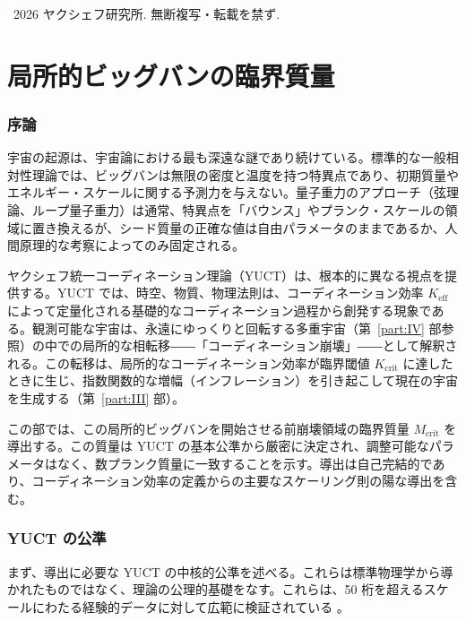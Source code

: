 \documentclass[11pt,a4paper]{article}
\begin{document}
	\vspace{0.5cm}
	\noindent
	\textcopyright\ 2026 ヤクシェフ研究所. 無断複写・転載を禁ず.
	
	\tableofcontents
	\newpage
	
	\part{局所的ビッグバンの臨界質量}
	\label{part:I}
	
	\section{序論}
	
	宇宙の起源は、宇宙論における最も深遠な謎であり続けている。標準的な一般相対性理論では、ビッグバンは無限の密度と温度を持つ特異点であり、初期質量やエネルギー・スケールに関する予測力を与えない。量子重力のアプローチ（弦理論、ループ量子重力）は通常、特異点を「バウンス」やプランク・スケールの領域に置き換えるが、シード質量の正確な値は自由パラメータのままであるか、人間原理的な考察によってのみ固定される。
	
	ヤクシェフ統一コーディネーション理論（YUCT）は、根本的に異なる視点を提供する。YUCT では、時空、物質、物理法則は、コーディネーション効率 \(K_{\mathrm{eff}}\) によって定量化される基礎的なコーディネーション過程から創発する現象である。観測可能な宇宙は、永遠にゆっくりと回転する多重宇宙（第~\ref{part:IV} 部参照）の中での局所的な相転移――「コーディネーション崩壊」――として解釈される。この転移は、局所的なコーディネーション効率が臨界閾値 \(K_{\mathrm{crit}}\) に達したときに生じ、指数関数的な増幅（インフレーション）を引き起こして現在の宇宙を生成する（第~\ref{part:III} 部）。
	
	この部では、この局所的ビッグバンを開始させる前崩壊領域の臨界質量 \(M_{\mathrm{crit}}\) を導出する。この質量は YUCT の基本公準から厳密に決定され、調整可能なパラメータはなく、数プランク質量に一致することを示す。導出は自己完結的であり、コーディネーション効率の定義からの主要なスケーリング則の陽な導出を含む。
	
	\section{YUCT の公準}
	
	まず、導出に必要な YUCT の中核的公準を述べる。これらは標準物理学から導かれたものではなく、理論の公理的基礎をなす。これらは、50 桁を超えるスケールにわたる経験的データに対して広範に検証されている \cite{AppendixL}。
	
\end{document}
